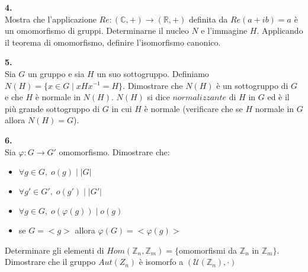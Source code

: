 \documentclass[italian,a4paper,11pt]
{article}
\newcommand{\Z}{\mathbb Z}
\newcommand{\R}{\mathbb{R}}
\newcommand{\C}{\mathbb{C}}
\newcommand{\U}{\mathcal{U}}
\newcommand{\acc}{\`}
\begin{document}
\vspace{0.4 cm}
\noindent
\begin{Ex}\textbf{ 4.}\\
Mostra che l'applicazione $Re: (\C, +) \longrightarrow (\R, +)$ definita da $Re(a+ib)=a$ \acc e un omomorfismo di gruppi. Determinarne il nucleo $N$ e l'immagine $H$. Applicando il teorema di omomorfismo, definire l'isomorfismo canonico.
\end{Ex}


\vspace{0.4cm}
\noindent
\begin{Ex}\textbf{ 5.}\\
Sia $G$ un gruppo e sia $H$ un suo sottogruppo. Definiamo $N(H)=\{x\in G \mid xHx^{-1}=H\}$. Dimostrare che $N(H)$ \`e un sottogruppo di $G$ e che $H$ \`e normale in $N(H)$. $N(H)$ si dice $normalizzante$ di $H$ in $G$ ed \`e il pi\`u grande sottogruppo di $G$ in cui $H$ \`e normale (verificare che se $H$ normale in $G$ allora $N(H)=G$).
\end{Ex}


\vspace{0.4cm}
\noindent
\begin{Ex}\textbf{ 6.}\\
Sia $\varphi: G\longrightarrow G'$ omomorfismo. Dimostrare che:
\begin{itemize}
\item $\forall g \in G, \; o(g)\mid |G|$
\item $\forall g' \in G', \; o(g')\mid |G'|$
\item $\forall g \in G ,\; o(\varphi(g))\mid o(g)$
\item se $G=<g>$ allora $\varphi(G)=<\varphi(g)>$
\end{itemize}
Determinare gli elementi di $Hom(\Z_n, \Z_m)=\{$omomorfismi da $\Z_n$ in $\Z_m\}$.
Dimostrare che il gruppo $Aut(Z_n)$ \`e isomorfo a $(\U(\Z_n), \cdot)$
\end{Ex}
\end{document}
